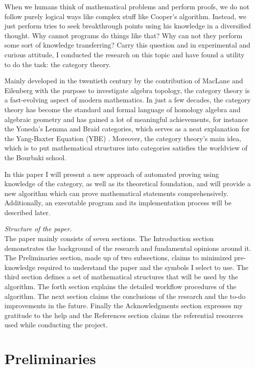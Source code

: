 \documentclass{article}
\numberwithin{theorem}{section}	%
\numberwithin{axiom}{section}	%
\numberwithin{definition}{section}	%
\begin{document}
When we humans think of mathematical problems and perform proofs, we do not follow purely logical ways like complex stuff like Cooper{'}s algorithm. Instead, we just perform tries to seek breakthrough points using his knowledge in a diversified thought. Why cannot programs do things like that? Why can not they perform some sort of knowledge transferring? Carry this question and in experimental and curious attitude, I conducted the research on this topic and have found a utility to do the task: the category theory.

Mainly developed in the twentieth century by the contribution of MacLane and Eilenberg with the purpose to investigate algebra topology, the category theory is a fast-evolving aspect of modern mathematics. In just a few decades, the category theory has become the standard and formal language of homology algebra and algebraic geometry and has gained a lot of meaningful achievements, for instance the Yoneda{'}s Lemma and Braid categories, which serves as a neat explanation for the Yang-Baxter Equation (YBE) \cite{1}. Moreover, the category theory{'}s main idea, which is to put mathematical structures into categories satisfies the worldview of the Bourbaki school.

In this paper I will present a new approach of automated proving using knowledge of the category, as well as its theoretical foundation, and will provide a new algorithm which can prove mathematical statements comprehensively. Additionally, an executable program and its implementation process will be described later.

\textit{ Structure of the paper.}\\
The paper mainly consists of seven sections. The Introduction section demonstrates the background of the research and fundamental opinions around it. The Preliminaries section, made up of two subsections, claims to minimized pre-knowledge required to understand the paper and the symbols I select to use. The third section defines a set of mathematical structures that will be used by the algorithm. The forth section explains the detailed workflow procedures of the algorithm. The next section claims the conclusions of the research and the to-do improvements in the future. Finally the Acknowledgments section expresses my gratitude to the help and the References section claims the referential resources used while conducting the project.

\section{Preliminaries}
\end{document}
